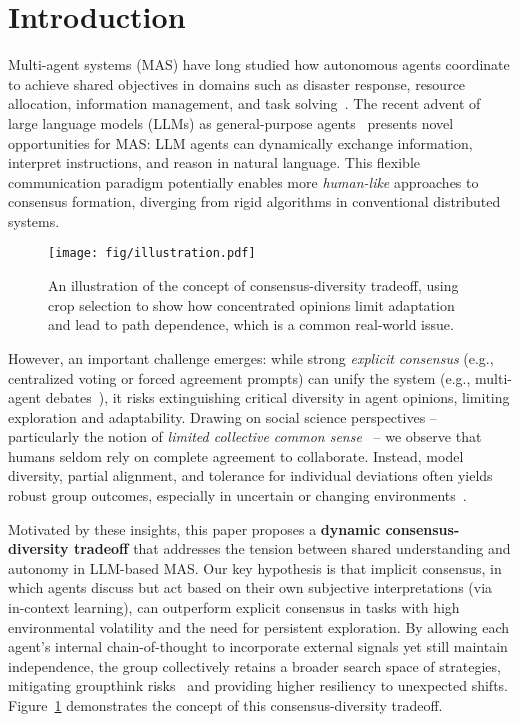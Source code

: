 \section{Introduction}

Multi-agent systems (MAS) have long studied how autonomous agents coordinate to achieve shared objectives in domains such as disaster response, resource allocation, information management, and task solving~\cite{chen2023multi, curșeu2017stakeholder, hongmetagpt, qian2024chatdev}. The recent advent of large language models (LLMs) as general-purpose agents~\cite{li2023camel, wu2023smart, xing2024designing} presents novel opportunities for MAS: LLM agents can dynamically exchange information, interpret instructions, and reason in natural language. This flexible communication paradigm potentially enables more \emph{human-like} approaches to consensus formation, diverging from rigid algorithms in conventional distributed systems.

\begin{figure}[t]
    \centering
    \texttt{[image: fig/illustration.pdf]}
    \vspace{-1.5em}
    \caption{An illustration of the concept of consensus-diversity tradeoff, using crop selection to show how concentrated opinions limit adaptation and lead to path dependence, which is a common real-world issue.}
    \vspace{-1.5em}
    \label{fig:illustration}
\end{figure}

However, an important challenge emerges: while strong \emph{explicit consensus} (e.g., centralized voting or forced agreement prompts) can unify the system (e.g., multi-agent debates~\cite{chanchateval}), it risks extinguishing critical diversity in agent opinions, limiting exploration and adaptability. Drawing on social science perspectives -- particularly the notion of \emph{limited collective common sense}~\cite{whiting2024framework} -- we observe that humans seldom rely on complete agreement to collaborate. Instead, model diversity, partial alignment, and tolerance for individual deviations often yields robust group outcomes, especially in uncertain or changing environments~\cite{chen-etal-2024-reconcile, dippel2024eliminating, duan2024enhancing, shang2019resilient}.

Motivated by these insights, this paper proposes a \textbf{dynamic consensus-diversity tradeoff} that addresses the tension between shared understanding and autonomy in LLM-based MAS. Our key hypothesis is that implicit consensus, in which agents discuss but act based on their own subjective interpretations (via in-context learning), can outperform explicit consensus in tasks with high environmental volatility and the need for persistent exploration. By allowing each agent's internal chain-of-thought to incorporate external signals yet still maintain independence, the group collectively retains a broader search space of strategies, mitigating groupthink risks~\cite{shang2019resilient} and providing higher resiliency to unexpected shifts. Figure~\ref{fig:illustration} demonstrates the concept of this consensus-diversity tradeoff.

